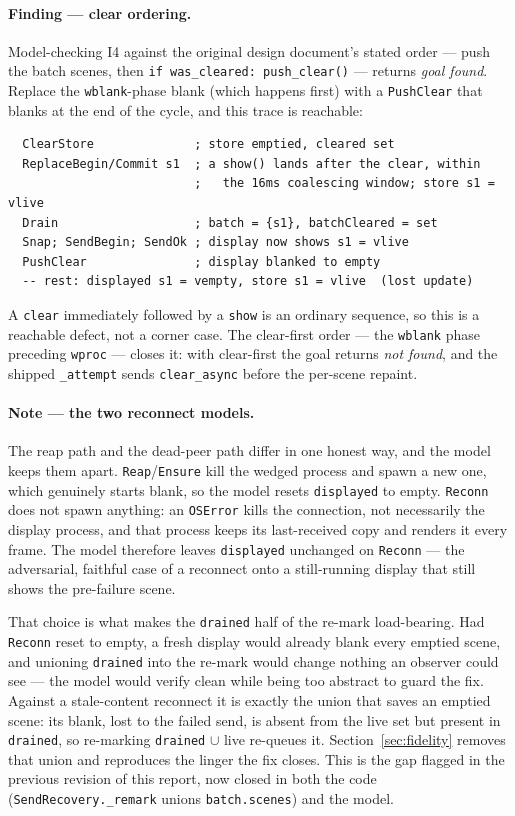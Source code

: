 \documentclass[a4paper,10pt,fleqn]{article}
\begin{document}
\paragraph{Finding --- clear ordering.}
Model-checking I4 against the original design document's stated order ---
push the batch scenes, then \texttt{if was\_cleared: push\_clear()} ---
returns \emph{goal found}.  Replace the \texttt{wblank}-phase blank (which
happens first) with a \texttt{PushClear} that blanks at the end of the
cycle, and this trace is reachable:
\begin{verbatim}
  ClearStore              ; store emptied, cleared set
  ReplaceBegin/Commit s1  ; a show() lands after the clear, within
                          ;   the 16ms coalescing window; store s1 = vlive
  Drain                   ; batch = {s1}, batchCleared = set
  Snap; SendBegin; SendOk ; display now shows s1 = vlive
  PushClear               ; display blanked to empty
  -- rest: displayed s1 = vempty, store s1 = vlive  (lost update)
\end{verbatim}
A \texttt{clear} immediately followed by a \texttt{show} is an ordinary
sequence, so this is a reachable defect, not a corner case.  The clear-first
order --- the \texttt{wblank} phase preceding \texttt{wproc} --- closes it:
with clear-first the goal returns \emph{not found}, and the shipped
\texttt{\_attempt} sends \texttt{clear\_async} before the per-scene repaint.

\paragraph{Note --- the two reconnect models.}
The reap path and the dead-peer path differ in one honest way, and the model
keeps them apart.  \texttt{Reap}/\texttt{Ensure} kill the wedged process and
spawn a new one, which genuinely starts blank, so the model resets
\texttt{displayed} to empty.  \texttt{Reconn} does not spawn anything: an
\texttt{OSError} kills the connection, not necessarily the display process,
and that process keeps its last-received copy and renders it every frame.
The model therefore leaves \texttt{displayed} unchanged on \texttt{Reconn} ---
the adversarial, faithful case of a reconnect onto a still-running display
that still shows the pre-failure scene.

That choice is what makes the \texttt{drained} half of the re-mark
load-bearing.  Had \texttt{Reconn} reset to empty, a fresh display would
already blank every emptied scene, and unioning \texttt{drained} into the
re-mark would change nothing an observer could see --- the model would verify
clean while being too abstract to guard the fix.  Against a stale-content
reconnect it is exactly the union that saves an emptied scene: its blank,
lost to the failed send, is absent from the live set but present in
\texttt{drained}, so re-marking \texttt{drained} $\cup$ live re-queues it.
Section~\ref{sec:fidelity} removes that union and reproduces the linger the
fix closes.  This is the gap flagged in the previous revision of this report,
now closed in both the code (\texttt{SendRecovery.\_remark} unions
\texttt{batch.scenes}) and the model.
\end{document}
